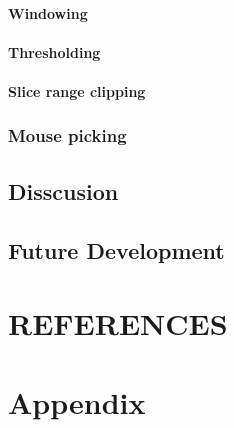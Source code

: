 \documentclass[twoside, english, 11pt]{report}
\begin{document}
\subsubsection{Windowing}
\subsubsection{Thresholding}
\subsubsection{Slice range clipping}
\subsection{Mouse picking}

\section{Disscusion}

\section{Future Development}

\chapter{REFERENCES}

\chapter{Appendix}
\end{document}
